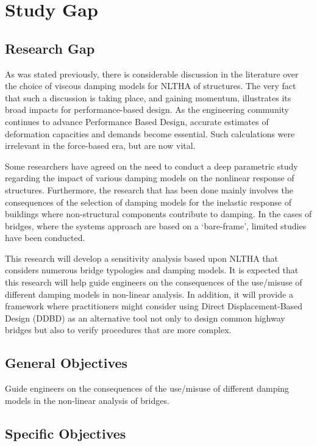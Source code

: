 \chapter{Study Gap}

\section{Research Gap}

As was stated previously, there is considerable discussion in the literature over the choice of viscous damping models for NLTHA of structures. The very fact that such a discussion is taking place, and gaining momentum, illustrates its broad impacts for performance-based design. As the engineering community continues to advance Performance Based Design, accurate estimates of deformation capacities and demands become essential. Such calculations were irrelevant in the force-based era, but are now vital.  

Some researchers have agreed on the need to conduct a deep parametric study regarding the impact of various damping models on the nonlinear response of structures. Furthermore, the research that has been done mainly involves the consequences of the selection of damping models for the inelastic response of buildings where non-structural components contribute to damping. In the cases of bridges, where the systems approach are based on a ‘bare-frame’, limited studies have been conducted. 

This research will develop a sensitivity analysis based upon NLTHA that considers numerous bridge typologies and damping models. It is expected that this research will help guide engineers on the consequences of the use/misuse of different damping models in non-linear analysis. In addition, it will provide a framework where practitioners might consider using Direct Displacement-Based Design (DDBD) as an alternative tool not only to design common highway bridges but also to verify procedures that are more complex.

\section{General Objectives}
Guide engineers on the consequences of the use/misuse of different damping models in the non-linear analysis of bridges.

\section{Specific Objectives}